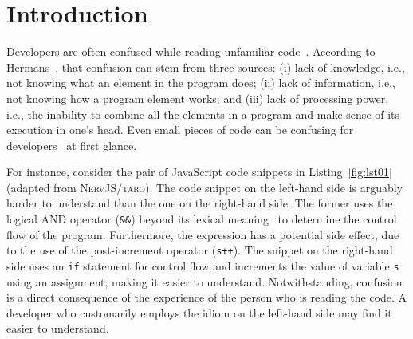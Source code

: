 \section{Introduction}
\label{intro}





Developers are often confused while reading unfamiliar code~\cite{Ebert:2021:ESC}. According to Hermans~\cite{ProgrammersBrain}, that confusion can stem from three sources: (i) lack of knowledge, i.e., not knowing what an element in the program does; (ii) lack of information, i.e., not knowing how a program element works; and (iii) lack of processing power, i.e., the inability to combine all the elements in a program and make sense of its execution in one's head. Even small pieces of code can be confusing for developers~\cite{Ajami:2017:SPI,DBLP:conf/sigsoft/GopsteinIYDZYC17} at first glance.

For instance, consider the pair of JavaScript code snippets in Listing~\ref{fig:lst01} (adapted from \textsc{NervJS/taro}). The code snippet on the left-hand side is arguably harder to understand than the one on the right-hand side. The former uses the logical AND operator (\texttt{\&\&}) beyond its lexical meaning~\cite{castor2018} to determine the control flow of the program. Furthermore, the expression has a potential side effect, due to the use of the post-increment operator (\texttt{s++}). The snippet on the right-hand side uses an \texttt{if} statement for control flow and increments the value of variable \texttt{s} using an assignment, making it easier to understand. Notwithstanding, confusion is a direct consequence of the experience of the person who is reading the code. A developer who customarily employs the idiom on the left-hand side may find it easier to understand. 

